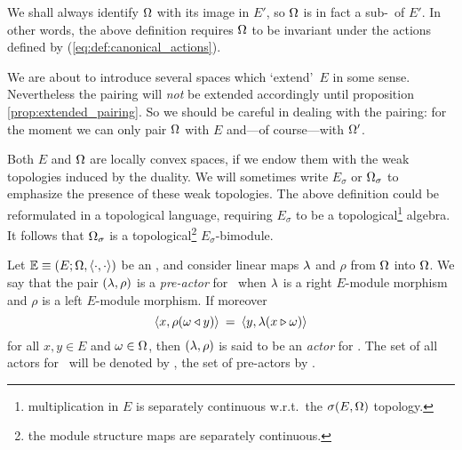 \begin{remarks}  \label{rem:topalg}
  \item
     We shall always identify $\Omega$ with its image in $E'$, so $\Omega$ is in fact
     a sub-\Ebimod\ of $E'$\@. In other words, the above definition
     requires $\Omega$ to be invariant under the actions defined by
     (\ref{eq:def:canonical_actions}).
  \item
     We are about to introduce several spaces which \lq extend\rq\ $E$ in
     some sense. Nevertheless the pairing will {\em not\/} be extended
     accordingly until proposition \ref{prop:extended_pairing}\@.
     So we should be careful in dealing with the pairing: for the moment we can only pair
     $\Omega$ with $E$ and---of course---with $\Omega'$.
  \item
     Both $E$ and $\Omega$ are locally convex spaces, if we endow them
     with the weak topologies induced by the duality.
     We will sometimes write $E_\sigma$ or $\Omega_\sigma$ to emphasize the
     presence of these weak topologies.
     The above definition could be reformulated in a topological language,
     requiring $E_\sigma$ to be a
     topological\footnote{multiplication in $E$ is separately continuous
     w.r.t.\ the $\sigma(E,\Omega)$ topology.} algebra. It follows that $\Omega_\sigma$ is a
     topological\footnote{the module structure maps are separately continuous.}
     $E_\sigma$-bimodule.
\end{remarks}


\begin{defn} \label{def:actor}
  Let $\mathbb{E} \equiv (E; \Omega, \langle\cdot, \cdot\rangle)$ be an \context, and consider linear maps $\lambda$ and $\rho$
  from $\Omega$ into $\Omega$. We say that the pair $(\lambda,\rho)$ is a {\em pre-actor\/}
  for \EE\ when $\lambda$ is a right $E$-module morphism and
  $\rho$ is a left $E$-module morphism. If moreover
  \begin{equation} \label{eq:bi-actor}
     \langle x,\rho(\omega \triangleleft y) \rangle  \:=\:  \langle y,\lambda(x\triangleright\omega) \rangle
  \end{equation}
  for all $x,y \in E$ and $\omega \in \Omega$, then $(\lambda,\rho)$ is said to be
  an {\em actor\/} for \EE\@. The set of all actors for \EE\ will be denoted by \ActE,
  the set of pre-actors by \PreE.
\end{defn}


